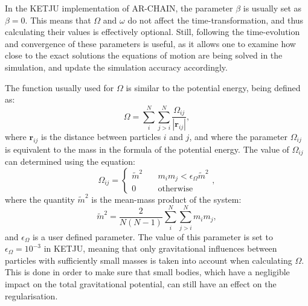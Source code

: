 \documentclass[english, twoside]{HYgradu}
\begin{document}
In the KETJU implementation of AR-CHAIN, the parameter $\beta$ is usually set as $\beta = 0$. This means that $\Omega$ and $\omega$ do not affect the time-transformation, and thus calculating their values is effectively optional. Still, following the time-evolution and convergence of these parameters is useful, as it allows one to examine how close to the exact solutions the equations of motion are being solved in the simulation, and update the simulation accuracy accordingly.   

The function usually used for $\Omega$ is similar to the potential energy, being defined as:
\begin{equation}
\Omega = \displaystyle\sum^N_i \displaystyle\sum^N_{j > i} \frac{\Omega_{ij}}{|\mathbf{r}_{ij}|}, \label{eq:ketju_omega}
\end{equation}
where $\mathbf{r}_{ij}$ is the distance between particles $i$ and $j$, and where the parameter $\Omega_{ij}$ is equivalent to the mass in the formula of the potential energy. The value of $\Omega_{ij}$ can determined using the equation:
\begin{equation}
\Omega_{ij} = 
\begin{cases}
\tilde{m}^2 &\quad m_i m_j < \epsilon_\Omega \tilde{m}^2 \\
0 &\quad \mathrm{otherwise}
\end{cases},
\end{equation}
where the quantity $\tilde{m}^2$ is the mean-mass product of the system:
\begin{equation}
\tilde{m}^2 = \frac{2}{N(N-1)} \displaystyle\sum^N_i \displaystyle\sum^N_{j > i} m_i m_j,
\end{equation}
and $\epsilon_\Omega$ is a user defined parameter. The value of this parameter is set to $\epsilon_\Omega = 10^{-3}$ in KETJU, meaning that only gravitational influences between particles with sufficiently small masses is taken into account when calculating $\Omega$. This is done in order to make sure that small bodies, which have a negligible impact on the total gravitational potential, can still have an effect on the regularisation. 
\end{document}
